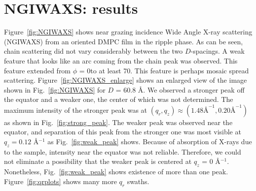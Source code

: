 


\newpage
\section{NGIWAXS: results}\label{sec:NGIWAXS_results}
Figure~\ref{fig:NGIWAXS} shows near grazing incidence Wide Angle X-ray
scattering (NGIWAXS) from an oriented DMPC film in the ripple phase.
As can be seen, chain scattering did not vary considerably
between the two $D$-spacings. A weak feature that looks like an 
arc coming from the chain peak was observed. This feature extended
from $\phi$ = 0\textdegree to at least 70\textdegree. This feature
is perhaps mosaic spread scattering.
Figure~\ref{fig:NGIWAXS_enlarge} shows an enlarged view of the image 
shown in Fig.~\ref{fig:NGIWAXS} for $D$ = 60.8 \AA. 
We observed a stronger peak off the 
equator and a weaker one, the center of which was not determined. 
The maximum intensity of the stronger peak was at 
$(q_r, q_z) \approx (1.48 \text{\AA}^{-1}, 0.20 \text{\AA}^{-1})$ as shown
in Fig.~\ref{fig:strong_peak}. The weaker peak was observed near the equator, and
separation of this peak from the stronger one was most visible at 
$q_z = 0.12$ \AA$^{-1}$ as Fig.~\ref{fig:weak_peak} shows. Because of absorption
of X-rays due to the sample, intensity near the equator was not reliable.
Therefore, we could not eliminate a possibility that the weaker peak
is centered at $q_z$ = 0 \AA$^{-1}$. Nonetheless, Fig.~\ref{fig:weak_peak} shows existence 
of more than one peak. Figure~\ref{fig:qrplots} shows many more
$q_r$ swaths.

